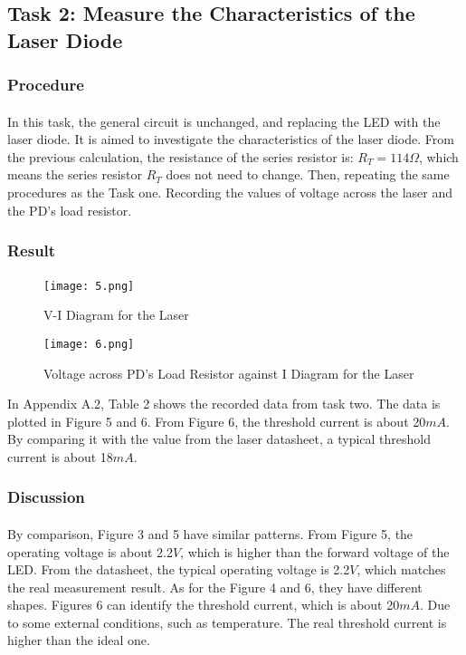 \documentclass[12pt]{article}
\begin{document}
    
    \subsection{Task 2: Measure the Characteristics of the Laser Diode}
    \subsubsection{Procedure}
    \paragraph{}
    In this task, the general circuit is unchanged, and replacing the LED with the laser diode. It is aimed to investigate the characteristics of the laser diode. From the previous calculation, the resistance of the series resistor is: $R_{T}=114\Omega$, which means the series resistor $R_{T}$ does not need to change. Then, repeating the same procedures as the Task one. Recording the values of voltage across the laser and the PD's load resistor.
  
    \subsubsection{Result}
    \paragraph{}
    \begin{figure}[h]
    \centering
    \begin{minipage}[t]{0.45\textwidth}
    \centering
    \texttt{[image: 5.png]}
    \caption{V-I Diagram for the Laser}
    \end{minipage}
    \begin{minipage}[t]{0.45\textwidth}
    \centering
    \texttt{[image: 6.png]}
    \caption{Voltage across PD's Load Resistor against I Diagram for the Laser}
    \end{minipage}
    \end{figure}
    In Appendix A.2, Table 2 shows the recorded data from task two. The data is plotted in Figure 5 and 6. From Figure 6, the threshold current is about 20$mA$. By comparing it with the value from the laser datasheet, a typical threshold current is about 18$mA$. 
    \subsubsection{Discussion}
    \paragraph{}
    By comparison, Figure 3 and 5 have similar patterns. From Figure 5, the operating voltage is about 2.2$V$, which is higher than the forward voltage of the LED. From the datasheet, the typical operating voltage is 2.2$V$, which matches the real measurement result. As for the Figure 4 and 6, they have different shapes. Figures 6 can identify the threshold current, which is about 20$mA$. Due to some external conditions, such as temperature. The real threshold current is higher than the ideal one. 
    
\end{document}
